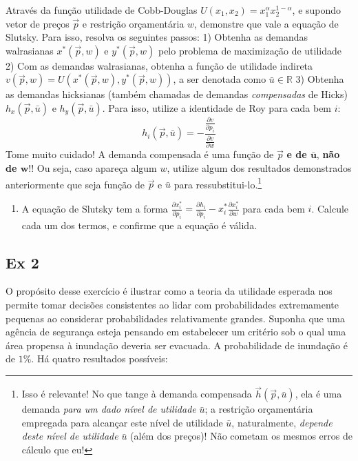 \documentclass[12pt]{article}
\numberwithin{equation}{section}
\theoremstyle{plain}
\theoremstyle{definition}
\theoremstyle{remark}
\begin{document}
Através da função utilidade de Cobb-Douglas \(U(x_{1},x_{2}) = x_{1}^{\alpha}x_{2}^{1-\alpha}\), e supondo vetor de preços \(\vec{p}\) e restrição orçamentária \(w\), demonstre que vale a equação de Slutsky. Para isso, resolva os seguintes passos: 1) Obtenha as demandas walrasianas \(x^*(\vec{p}, w)\) e \(y^*(\vec{p},w)\) pelo problema de maximização de utilidade 2) Com as demandas walrasianas, obtenha a função de utilidade indireta \(v(\vec{p}, w) = U(x^*(\vec{p},w), y^*(\vec{p},w))\), a ser denotada como \(\bar{u} \in \mathbb{R}\) 3) Obtenha as demandas hicksianas (também chamadas de demandas \textit{compensadas} de Hicks) \(h_{x}(\vec{p}, \bar{u})\) e \(h_{y}(\vec{p}, \bar{u})\). Para isso, utilize a identidade de Roy para cada bem \(i\):
\[
h_{i}(\vec{p}, \bar{u}) = -\frac{\frac{ \partial v }{ \partial p_{i} }}{\frac{ \partial v }{ \partial w } }
\]
Tome muito cuidado! A demanda compensada é uma função de \(\vec{p}\) \textbf{e de \(\mathbf{\bar{u}}\)}, \textbf{não de \(\mathbf{w}\)}!! Ou seja, caso apareça algum \(w\), utilize algum dos resultados demonstrados anteriormente que seja função de \(\vec{p}\) e \(\bar{u}\) para ressubstitui-lo.\footnote{Isso é relevante! No que tange à demanda compensada \(\vec{h}(\vec{p}, \bar{u})\), ela é uma demanda \textit{para um dado nível de utilidade} \(\bar{u}\); a restrição orçamentária empregada para alcançar este nível de utilidade \(\bar{u}\), naturalmente, \textit{depende deste nível de utilidade} \(\bar{u}\) (além dos preços)! Não cometam os mesmos erros de cálculo que eu!}

\begin{enumerate}
\def\labelenumi{\arabic{enumi})}
\setcounter{enumi}{3}
\tightlist
\item
  A equação de Slutsky tem a forma \(\frac{ \partial x^*_{i} }{ \partial p_{i} } = \frac{ \partial h_{i} }{ \partial p_{i} } - x^*_{i} \frac{ \partial x_{i}^* }{ \partial w }\) para cada bem \(i\). Calcule cada um dos termos, e confirme que a equação é válida.
\end{enumerate}

\hypertarget{ex-2-mas-colell1995-exercuxedcio-6.b.4}{%
\subsection{\texorpdfstring{Ex 2 \parencite[, exercício 6.B.4]{Mas-Colell1995}}{Ex 2 }}\label{ex-2-mas-colell1995-exercuxedcio-6.b.4}}

O propósito desse exercício é ilustrar como a teoria da utilidade esperada nos permite tomar decisões consistentes ao lidar com probabilidades extremamente pequenas ao considerar probabilidades relativamente grandes. Suponha que uma agência de segurança esteja pensando em estabelecer um critério sob o qual uma área propensa à inundação deveria ser evacuada. A probabilidade de inundação é de \(1\%\). Há quatro resultados possíveis:
\end{document}
